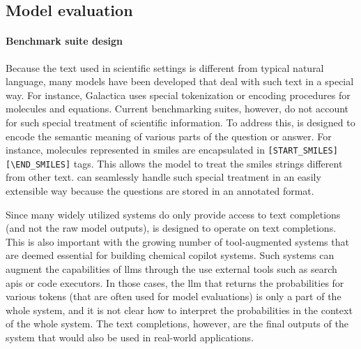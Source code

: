 \documentclass[11pt, oneside]{article}
\begin{document}
\begin{refsection}
\subsection{Model evaluation}

\paragraph{Benchmark suite design} Because the text used in scientific settings is different from typical natural language, many models have been developed that deal with such text in a special way.
For instance, Galactica\autocite{taylor2022galactica} uses special tokenization or encoding procedures for molecules and equations. 
Current benchmarking suites, however, do not account for such special treatment of scientific information.
To address this, \chembench is designed to encode the semantic meaning of various parts of the question or answer.  
For instance, molecules represented in \gls{smiles} are encapsulated in \texttt{[START\_SMILES][\textbackslash END\_SMILES]} tags. 
This allows the model to treat the \gls{smiles} strings different from other text. 
\chembench can seamlessly handle such special treatment in an easily extensible way because the questions are stored in an annotated format.

Since many widely utilized systems do only provide access to text completions (and not the raw model outputs), \chembench is designed to operate on text completions.
This is also important with the growing number of tool-augmented systems that are deemed essential for building chemical copilot systems. 
Such systems can augment the capabilities of \glspl{llm} through the use external tools such as search \glspl{api} or code executors.\autocite{schick2024toolformer, karpas2022mrkl, yao2022react}
In those cases, the \gls{llm} that returns the probabilities for various tokens (that are often used for model evaluations\autocite{Fourrier_Habib_Launay_Wolf}) is only a part of the whole system, and it is not clear how to interpret the probabilities in the context of the whole system.
The text completions, however, are the final outputs of the system that would also be used in real-world applications.


\end{refsection}
\end{document}
